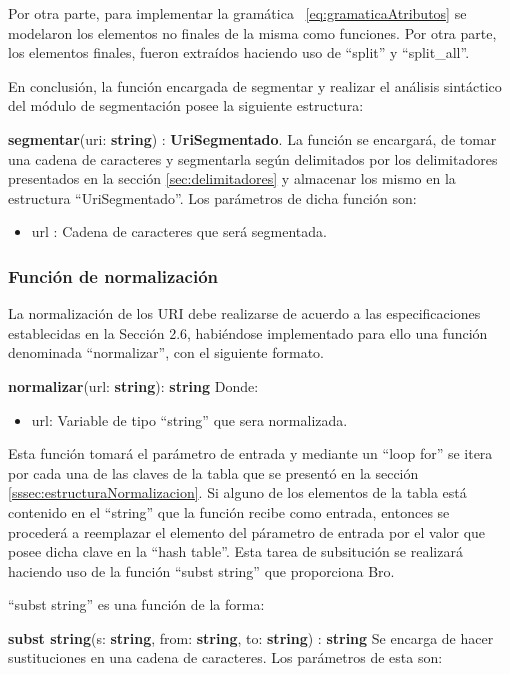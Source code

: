 Por otra parte, para implementar la gramática ~\ref{eq:gramaticaAtributos} se modelaron los elementos no finales de la misma como funciones. Por otra parte, los elementos finales, fueron extraídos haciendo uso de ``split'' y ``split\_all''.

En conclusión, la función encargada de segmentar y realizar el análisis sintáctico del módulo de segmentación posee la siguiente estructura:

\textbf{segmentar}(uri: \textbf{string}) : \textbf{UriSegmentado}.
La función se encargará, de tomar una cadena de caracteres y segmentarla según delimitados por los delimitadores presentados en la sección \ref{sec:delimitadores} y almacenar los mismo en la estructura ``UriSegmentado''.
Los parámetros de dicha función son:
\begin{itemize}
\item url : Cadena de caracteres que será segmentada.
\end{itemize}

\subsubsection{Función de normalización}

La normalización de los URI debe realizarse de acuerdo a las especificaciones establecidas en la Sección 2.6, habiéndose implementado para ello una función denominada ``normalizar'', con el siguiente formato.

\textbf{normalizar}(url: \textbf{string}): \textbf{string} Donde:

\begin{itemize}
\item url: Variable de tipo ``string'' que sera normalizada.
\end{itemize}

Esta función tomará el parámetro de entrada y mediante un ``loop for''
se itera por cada una de las claves de la tabla que se presentó en la sección \ref{sssec:estructuraNormalizacion}. Si alguno de los elementos de la tabla está contenido en el ``string'' que la función recibe como entrada, entonces se procederá a reemplazar el elemento del párametro de entrada por el valor que posee dicha clave en la ``hash table''. Esta tarea de subsitución se realizará haciendo uso de la función ``subst string'' que proporciona Bro.

``subst string'' es una función de la forma:

\textbf{subst string}(s: \textbf{string}, from: \textbf{string}, to: \textbf{string}) : \textbf{string}
Se encarga de hacer sustituciones en una cadena de caracteres. Los
parámetros de esta son:

